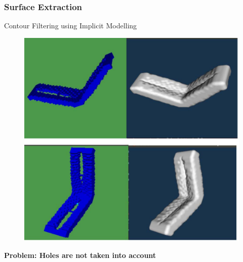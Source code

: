\begin{frame}

	\frametitle{Surface Extraction}
	\begin{minipage}{0.85\textwidth}
	\text Contour Filtering using Implicit Modelling 


	\begin{figure}
	\includegraphics[scale=0.35]{Pictures/contouring.pdf}

	\end{figure}


	\textbf {Problem: Holes are not taken into account}


\end{minipage}
\end{frame}
